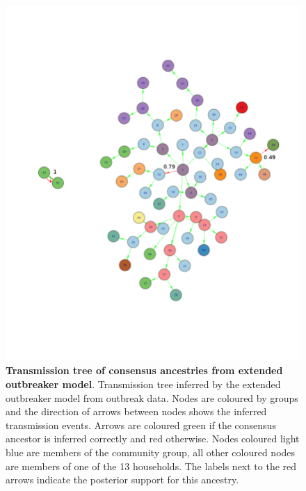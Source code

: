 \documentclass[11pt,a4paper]{report}
\begin{document}
\begin{figure}[h!]
\centering
\includegraphics[scale=0.5]{tree_with_grps.png} \newline
\caption{{\bf Transmission tree of consensus ancestries from extended outbreaker model}. Transmission tree inferred by the extended outbreaker model from outbreak data. Nodes are coloured by groups and the direction of arrows between nodes shows the inferred transmission events. Arrows are coloured green if the consensus ancestor is inferred correctly and red otherwise. Nodes coloured light blue are members of the community group, all other coloured nodes are members of one of the 13 households. The labels next to the red arrows indicate the posterior support for this ancestry.}
\end{figure}
\end{document}
